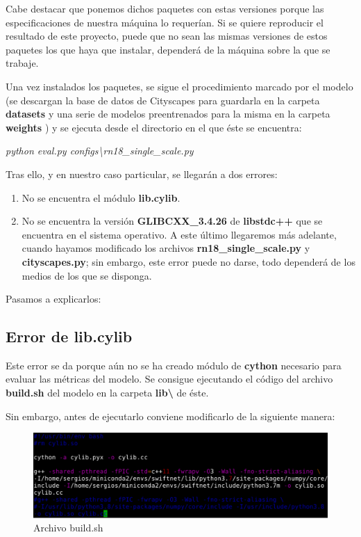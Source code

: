 Cabe destacar que ponemos dichos paquetes con estas versiones porque las especificaciones de nuestra máquina lo requerían. Si se quiere reproducir el resultado de este proyecto, puede que no sean las mismas versiones de estos paquetes los que haya que instalar, dependerá de la máquina sobre la que se trabaje.

Una vez instalados los paquetes, se sigue el procedimiento marcado por el modelo (se descargan la base de datos de Cityscapes \cite{cityscapes} para guardarla en la carpeta \textbf{datasets} y una serie de modelos preentrenados para la misma en la carpeta \textbf{weights} \cite{github_swiftnet}) y se ejecuta desde el directorio en el que éste se encuentra:

\begin{center}
\textit{python eval.py configs\textbackslash{rn18\_single\_scale.py}}
\end{center}

Tras ello, y en nuestro caso particular, se llegarán a dos errores:

\begin{enumerate}
\item No se encuentra el módulo \textbf{lib.cylib}.
\item No se encuentra la versión \textbf{GLIBCXX\_3.4.26} de \textbf{libstdc++} que se encuentra en el sistema operativo. A este último llegaremos más adelante, cuando hayamos modificado los archivos \textbf{rn18\_single\_scale.py} y \textbf{cityscapes.py}; sin embargo, este error puede no darse, todo dependerá de los medios de los que se disponga.
\end{enumerate}

Pasamos a explicarlos:

\subsection{Error de lib.cylib}

Este error se da porque aún no se ha creado módulo de \textbf{cython} \cite{cython} necesario para evaluar las métricas del modelo. Se consigue ejecutando el código del archivo \textbf{build.sh} del modelo en la carpeta \textbf{lib\textbackslash{}} de éste.

Sin embargo, antes de ejecutarlo conviene modificarlo de la siguiente manera:

\begin{figure}[H]
  \centering
  \includegraphics[width=12cm]{Figuras/cylib.eps}
  \caption{Archivo build.sh}
  \label{fig:cylib}
\end{figure}

